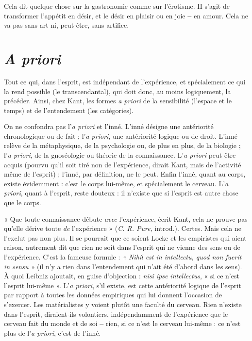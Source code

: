Cela dit quelque chose sur la gastronomie comme sur l'érotisme. II s’agit de
transformer l’appétit en désir, et le désir en plaisir ou en joie {\bf --} en amour. Cela
ne va pas sans art ni, peut-être, sans artifice.

\section{\it A priori}
Tout ce qui, dans l'esprit, est indépendant de l’expérience, et spécialement
ce qui la rend possible (le transcendantal), qui doit
donc, au moins logiquement, la précéder. Ainsi, chez Kant, les formes {\it a priori}
de la sensibilité (l’espace et le temps) et de l’entendement (les catégories).

On ne confondra pas l’{\it a priori} et l’inné. L’inné désigne une antériorité
chronologique ou de fait ; l’{\it a priori}, une antériorité logique ou de droit. L’inné
relève de la métaphysique, de la psychologie ou, de plus en plus, de la biologie ;
l’{\it a priori}, de la gnoséologie ou théorie de la connaissance. L’{\it a priori} peut être
acquis (pourvu qu’il soit tiré non de l’expérience, dirait Kant, mais de l’activité
même de l'esprit) ; l’inné, par définition, ne le peut. Enfin l’inné, quant au
corps, existe évidemment : c’est le corps lui-même, et spécialement le cerveau.
L’{\it a priori}, quant à l'esprit, reste douteux : il n’existe que si l’esprit est autre
chose que le corps.

« Que toute connaissance débute {\it avec} l'expérience, écrit Kant, cela ne
prouve pas qu’elle dérive toute {\it de} l’expérience » ({\it C. R. Pure}, introd.). Certes.
Mais cela ne l’exclut pas non plus. Il se pourrait que ce soient Locke et les
empiristes qui aient raison, autrement dit que rien ne soit dans l'esprit qui
ne vienne des sens ou de l’expérience. C’est la fameuse formule : {\it « Nihil est
in intellectu, quod non fuerit in sensu »} (il n’y a rien dans l’entendement qui
n'ait été d’abord dans les sens). À quoi Leibniz ajoutait, en guise d’objection :
{\it nisi ipse intellectus}, « si ce n’est l'esprit lui-même ». L’{\it a priori}, s’il
existe, est cette antériorité logique de l'esprit par rapport à toutes les données
empiriques qui lui donnent l’occasion de s'exercer. Les matérialistes y
voient plutôt une faculté du cerveau. Rien n’existe dans l'esprit, diraient-ils
volontiers, indépendamment de l’expérience que le cerveau fait du monde et
de soi {\bf --} rien, si ce n’est le cerveau lui-même : ce n’est plus de l’{\it a priori}, c’est
de l’inné.

